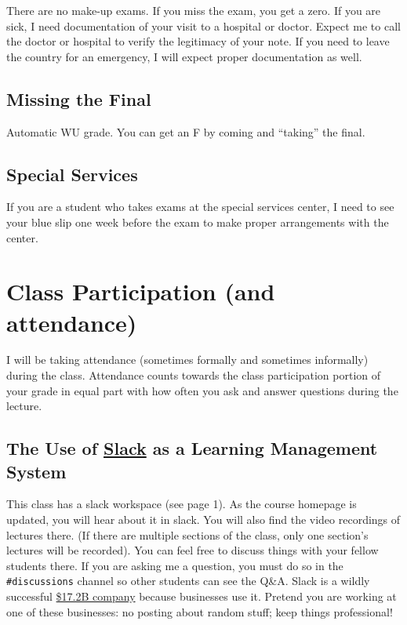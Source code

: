 \documentclass[12pt]{article}
\newcommand{\qu}[1]{``#1''}
\begin{document}
There are no make-up exams. If you miss the exam, you get a zero. If you are sick, I need documentation of your visit to a hospital or doctor. Expect me to call the doctor or hospital to verify the legitimacy of your note. If you need to leave the country for an emergency, I will expect proper documentation as well.


\subsection*{Missing the Final}

Automatic WU grade. You can get an F by coming and \qu{taking} the final.

\subsection*{Special Services}

If you are a student who takes exams at the special services center, I need to see your blue slip one week before the exam to make proper arrangements with the center.

\section*{Class Participation (and attendance)}

I will be taking attendance (sometimes formally and sometimes informally) during the class. Attendance counts towards the class participation portion of your grade in equal part with how often you ask and answer questions during the lecture.

\subsection*{The Use of \href{slack.com}{Slack} as a Learning Management System}\label{sec:slack}

This class has a slack workspace (see page 1). As the course homepage is updated, you will hear about it in slack. You will also find the video recordings of lectures there. (If there are multiple sections of the class, only one section's lectures will be recorded). You can feel free to discuss things with your fellow students there. If you are asking me a question, you must do so in the \texttt{\#discussions} channel so other students can see the Q\&A. Slack is a wildly successful \href{https://www.google.com/search?tbm=fin&q=NYSE&q=WORK}{\$17.2B company} because businesses use it. Pretend you are working at one of these businesses: no posting about random stuff; keep things professional! 
\end{document}
